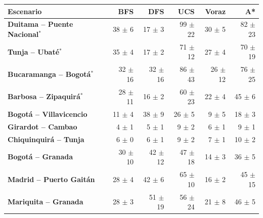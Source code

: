 \renewcommand{\arraystretch}{1.2}
\begin{tabular}{|l|r|r|r|r|r|}
\hline
\rowcolor{gray!20} \textbf{Escenario} & \textbf{BFS} & \textbf{DFS} & \textbf{UCS} & \textbf{Voraz} & \textbf{A*} \\
\hline
\textbf{Duitama -- Puente Nacional$^{*}$} & 38 $\pm$ 6 & 17 $\pm$ 3 & 99 $\pm$ 22 & 30 $\pm$ 5 & 82 $\pm$ 23 \\
\hline
\textbf{Tunja -- Ubaté$^{*}$} & 35 $\pm$ 4 & 17 $\pm$ 2 & 71 $\pm$ 12 & 27 $\pm$ 4 & 70 $\pm$ 19 \\
\hline
\textbf{Bucaramanga -- Bogotá$^{*}$} & 32 $\pm$ 16 & 32 $\pm$ 16 & 86 $\pm$ 43 & 26 $\pm$ 12 & 76 $\pm$ 25 \\
\hline
\textbf{Barbosa -- Zipaquirá$^{*}$} & 28 $\pm$ 11 & 16 $\pm$ 2 & 60 $\pm$ 23 & 22 $\pm$ 4 & 45 $\pm$ 6 \\
\hline
\textbf{Bogotá -- Villavicencio} & 11 $\pm$ 4 & 38 $\pm$ 9 & 26 $\pm$ 5 & 9 $\pm$ 5 & 18 $\pm$ 3 \\
\hline
\textbf{Girardot -- Cambao} & 4 $\pm$ 1 & 5 $\pm$ 1 & 9 $\pm$ 2 & 6 $\pm$ 1 & 9 $\pm$ 1 \\
\hline
\textbf{Chiquinquirá -- Tunja} & 6 $\pm$ 0 & 6 $\pm$ 1 & 9 $\pm$ 2 & 7 $\pm$ 1 & 10 $\pm$ 2 \\
\hline
\textbf{Bogotá -- Granada} & 30 $\pm$ 10 & 42 $\pm$ 12 & 47 $\pm$ 18 & 14 $\pm$ 3 & 36 $\pm$ 5 \\
\hline
\textbf{Madrid -- Puerto Gaitán} & 28 $\pm$ 4 & 42 $\pm$ 6 & 65 $\pm$ 10 & 16 $\pm$ 2 & 45 $\pm$ 15 \\
\hline
\textbf{Mariquita -- Granada} & 28 $\pm$ 3 & 51 $\pm$ 19 & 56 $\pm$ 24 & 21 $\pm$ 8 & 46 $\pm$ 5 \\
\hline
\end{tabular}
